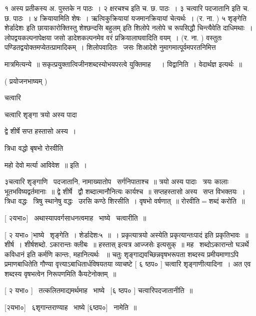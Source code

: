 \documentclass[11pt, openany]{book}
\begin{document}
१ अस्य प्रतीकस्य अ. पुस्तके न पाठः~। २ क्षरचश्च इति च. छ. पाठः~। ३
{\qt चत्वारि पदजातानि} इति च. छ. पाठः~। ४ क्रियायामिति शेषः~। 
ऋत्विकुक्रियायां यजमानक्रियायां चेत्यर्थः~। (र. ना. ) ५ {\qt शृङ्गेति
शेर्डादेशः} इति छायाकारोक्तिस्तु {\qt शेश्छन्दसि बहुलम्} इति शिलोपे नलोपे च
रूपसिद्धौ चिन्त्यैवेति दाधिमथाः~। लोपद्वयकल्पनापेक्षया जसो डादेशकल्पनमेव
वरं प्रक्रियालाघवादिति वयम्~। (र. ना. ) वस्तुतः
पण्डितद्वयोक्तमप्येतत्प्रामादिकम्~। शिलोपवादितः \textendash\ जसः शिआदेशे
नुमागमात्पूर्वमपरतनिमित्त \textendash\ 





मात्रमित्यन्ये~॥ सकृत्प्रयुक्तात्विजीनशब्दस्योभयपरत्वे युक्तिमाह \textendash\ ~। 
विद्वानिति~। वेदार्थज्ञ इत्यर्थः~॥ 

 ( प्रयोजनभाष्यम् ) 

चत्वारि \textendash\ 

चत्वारि शृङ्गा त्रयो अस्य पादा 

द्वे शीर्षे सप्त हस्तासो अस्य~। 

त्रिधा वद्धो बृषभो रोरवीति 

महो देवो मर्त्या आविवेश~॥ इति~। 

 ३चत्वारि शृङ्गाणि \textendash\ पदजातानि, नामाख्यातोप \textendash\ सर्गनिपाताश्च~॥ त्रयो अस्य
पादाः \textendash\ त्रयः कालाः भूतभविष्यद्वर्तमानाः~॥ द्वे शीर्षे \textendash\ द्वौ
शब्दात्मानौनित्यः कार्यश्च~॥ सप्तहस्तासो अस्य \textendash\ सप्त विभक्तयः~। त्रिधा
वद्धः \textendash\ त्रिषु स्थानेषु वद्धः \textendash\ उरसि कण्ठे शिरसीति~। वृषभो वर्षणात्~॥
रोरवीति$=$शब्दं करोति~॥ 



 [ २यभा०] \textendash\ अथास्यापवर्गसाधनत्वमाह \textendash\ भाष्ये \textendash\ चत्वारीति~॥ 

 [ २ यभा० ]भाष्ये \textendash\ शृङ्गेति~। शेर्डादेशः५~॥~। {\qt प्रकृत्यात्रयो}
अस्येति प्रकृत्यान्तःपादं इति प्रकृतिभावः~॥ शीर्ष~। शीर्षशब्दो.
ऽकारान्तः क्लीबः~॥ हस्तास् इत्यत्र आज्जसेः इत्यसुक्~॥ मह \textendash\ 
शब्दोऽकारान्तो {\qt घञर्थे कविधानं} इति कर्मणि कान्तः, महानित्यर्थः
~॥ चतुः शृङ्गाद्यवच्छिन्नवृषभरूपता शब्दस्य प्रमीयमाणाऽपि
प्रमाणबाधितेति गौण्या वृत्त्याऽबाधितार्धविषयतया व्याचष्टे [ ६ ष्ठप०
] चत्वारि शृङ्गाणीत्यादिना~। अत एव शब्दस्य वृषभत्वेन निरूपणमिति
कैयटेनोक्तम्~॥ 

 [ २ यभा० ] \textendash\ तत्कलितमाद्यमर्थमाह \textendash\ भाष्ये \textendash\ [६ ष्ठप० ]
चत्वारिपदजातानीति~॥ 

 [२यभा०] \textendash\ ६शृगान्तराण्याह \textendash\ भाष्ये [६ष्ठप०] \textendash\ नामेति~॥ 
\end{document}
